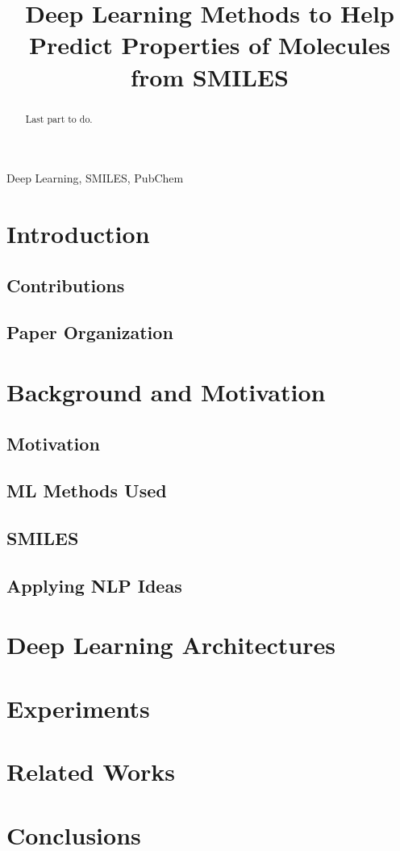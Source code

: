 \documentclass[conference]{IEEEtran}
\begin{document}
\title{Deep Learning Methods to Help Predict Properties of Molecules from SMILES}

\maketitle

\begin{abstract}
Last part to do.
\end{abstract}

\begin{IEEEkeywords}
Deep Learning, SMILES, PubChem
\end{IEEEkeywords}

\section{Introduction \label{intro}}

\subsection{Contributions}
\subsection{Paper Organization}

\section{Background and Motivation \label{background}}
\subsection{Motivation}
\subsection{ML Methods Used}
\subsection{SMILES}
\subsection{Applying NLP Ideas}

\section{Deep Learning Architectures \label{archi}}

\section{Experiments \label{experiments}}

\section{Related Works \label{relwork}}
\section{Conclusions \label{conclude}}
\end{document}
